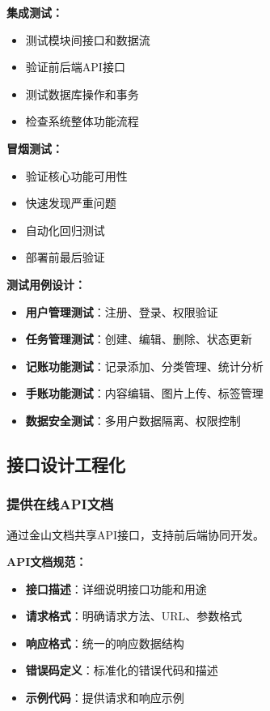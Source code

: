 \documentclass[a4paper]{article}
\begin{document}
\textbf{集成测试：}
\begin{itemize}
    \item 测试模块间接口和数据流
    \item 验证前后端API接口
    \item 测试数据库操作和事务
    \item 检查系统整体功能流程
\end{itemize}

\textbf{冒烟测试：}
\begin{itemize}
    \item 验证核心功能可用性
    \item 快速发现严重问题
    \item 自动化回归测试
    \item 部署前最后验证
\end{itemize}

\textbf{测试用例设计：}
\begin{itemize}
    \item \textbf{用户管理测试}：注册、登录、权限验证
    \item \textbf{任务管理测试}：创建、编辑、删除、状态更新
    \item \textbf{记账功能测试}：记录添加、分类管理、统计分析
    \item \textbf{手账功能测试}：内容编辑、图片上传、标签管理
    \item \textbf{数据安全测试}：多用户数据隔离、权限控制
\end{itemize}

\subsection{接口设计工程化}

\subsubsection{提供在线API文档}

通过金山文档共享API接口，支持前后端协同开发。

\textbf{API文档规范：}
\begin{itemize}
    \item \textbf{接口描述}：详细说明接口功能和用途
    \item \textbf{请求格式}：明确请求方法、URL、参数格式
    \item \textbf{响应格式}：统一的响应数据结构
    \item \textbf{错误码定义}：标准化的错误代码和描述
    \item \textbf{示例代码}：提供请求和响应示例
\end{itemize}
\end{document}
